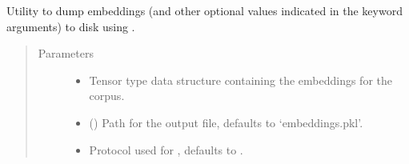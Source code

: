\documentclass[letterpaper,10pt,english]{sphinxmanual}
\begin{document}
\begin{fulllineitems}
\label{\detokenize{code:code_utils.utils.store_embeddings}}
Utility to dump embeddings (and other optional values indicated in the 
keyword arguments) to disk using .
\begin{quote}\begin{description}
\item[{Parameters}] \leavevmode\begin{itemize}
\item {} 
 \textendash{} Tensor type data structure containing the embeddings
for the corpus.

\item {} 
 (\sphinxstyleliteralemphasis{\sphinxupquote{, }}) \textendash{} Path for the output file, defaults to ‘embeddings.pkl’.

\item {} 
 \textendash{} Protocol used for , defaults to .

\end{itemize}

\end{description}\end{quote}

\end{fulllineitems}

\end{document}
